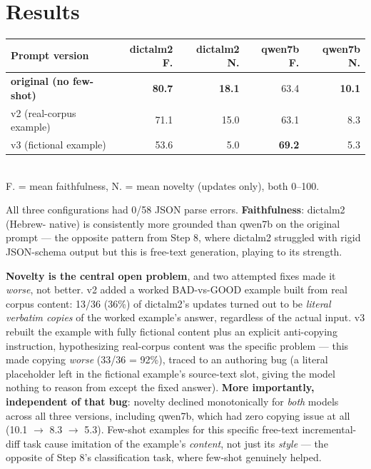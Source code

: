 \documentclass[11pt,a4paper]{article}
\begin{document}
\section{Results}

\begin{center}
\small
\begin{tabular}{lrrrr}
\toprule
\textbf{Prompt version} & \textbf{dictalm2 F.} & \textbf{dictalm2 N.} & \textbf{qwen7b F.} & \textbf{qwen7b N.} \\
\midrule
\textbf{original (no few-shot)} & \textbf{80.7} & \textbf{18.1} & 63.4 & \textbf{10.1} \\
v2 (real-corpus example) & 71.1 & 15.0 & 63.1 & 8.3 \\
v3 (fictional example) & 53.6 & 5.0 & \textbf{69.2} & 5.3 \\
\bottomrule
\end{tabular}
\\[0.3em]
{\footnotesize F. = mean faithfulness, N. = mean novelty (updates only), both 0--100.}
\end{center}

All three configurations had 0/58 JSON parse errors. \textbf{Faithfulness}: dictalm2 (Hebrew-
native) is consistently more grounded than qwen7b on the original prompt --- the opposite
pattern from Step 8, where dictalm2 struggled with rigid JSON-schema output but this is
free-text generation, playing to its strength.

\textbf{Novelty is the central open problem}, and two attempted fixes made it \emph{worse}, not
better. v2 added a worked BAD-vs-GOOD example built from real corpus content: 13/36 (36\%) of
dictalm2's updates turned out to be \emph{literal verbatim copies} of the worked example's
answer, regardless of the actual input. v3 rebuilt the example with fully fictional content plus
an explicit anti-copying instruction, hypothesizing real-corpus content was the specific
problem --- this made copying \emph{worse} (33/36 = 92\%), traced to an authoring bug (a literal
placeholder left in the fictional example's source-text slot, giving the model nothing to reason
from except the fixed answer). \textbf{More importantly, independent of that bug}: novelty
declined monotonically for \emph{both} models across all three versions, including qwen7b, which
had zero copying issue at all (10.1 $\to$ 8.3 $\to$ 5.3). Few-shot examples for this specific
free-text incremental-diff task cause imitation of the example's \emph{content}, not just its
\emph{style} --- the opposite of Step 8's classification task, where few-shot genuinely helped.
\end{document}
